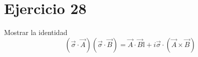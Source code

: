 \section*{Ejercicio 28}
Mostrar la identidad 
\begin{equation*}
    \left(\vec{\sigma}\cdot \vec{A}\right)\left(\vec{\sigma}\cdot\vec{B}\right) = \vec{A}\cdot \vec{B} \mathbb{I} + i 
    \vec{\sigma} \cdot \left(\vec{A}\times \vec{B}\right)
\end{equation*}